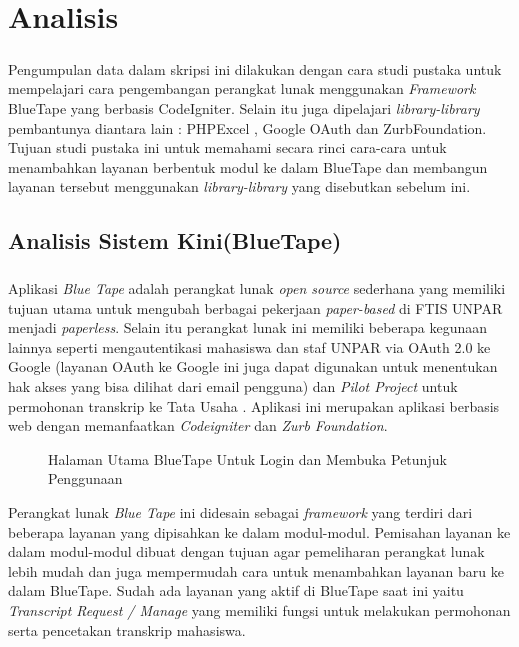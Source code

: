 \chapter{Analisis}
\label{chap:analisis}
\setcounter{secnumdepth}{3}

\paragraph{} Pengumpulan data dalam skripsi ini dilakukan dengan cara studi pustaka untuk mempelajari cara pengembangan perangkat lunak menggunakan \textit{Framework} BlueTape yang berbasis CodeIgniter. Selain itu juga dipelajari \textit{library-library} pembantunya diantara lain : PHPExcel , Google OAuth dan ZurbFoundation. Tujuan studi pustaka ini untuk memahami secara rinci cara-cara untuk menambahkan layanan berbentuk modul ke dalam BlueTape dan membangun layanan tersebut menggunakan \textit{library-library} yang disebutkan sebelum ini.

\section{Analisis Sistem Kini(BlueTape)}
\paragraph{} Aplikasi \textit{Blue Tape} adalah perangkat lunak \textit{open source} sederhana yang memiliki tujuan utama untuk mengubah berbagai pekerjaan \textit{paper-based} di FTIS UNPAR menjadi \textit{paperless}. Selain itu perangkat lunak ini memiliki beberapa kegunaan lainnya seperti mengautentikasi mahasiswa dan staf UNPAR via OAuth 2.0 ke Google (layanan OAuth ke Google ini juga dapat digunakan untuk menentukan hak akses yang bisa dilihat dari email pengguna) dan \textit{Pilot Project} untuk permohonan transkrip ke Tata Usaha . Aplikasi ini merupakan aplikasi berbasis web dengan memanfaatkan \textit{Codeigniter} dan \textit{Zurb Foundation}. 
\newline
\begin{figure} [H]
	\centering  
	\caption[Halaman Utama BlueTape Untuk Login dan Membuka Petunjuk Penggunaan]{Halaman Utama BlueTape Untuk Login dan Membuka Petunjuk Penggunaan} 
	\label{fig:flow-chart-CodeIgniter} 
\end{figure}
Perangkat lunak \textit{Blue Tape} ini didesain sebagai \textit{framework} yang terdiri dari beberapa layanan yang dipisahkan ke dalam modul-modul. Pemisahan layanan ke dalam modul-modul dibuat dengan tujuan agar pemeliharan perangkat lunak lebih mudah dan juga mempermudah cara untuk menambahkan layanan baru ke dalam BlueTape. Sudah ada layanan yang aktif di BlueTape saat ini yaitu \textit{Transcript Request / Manage} yang memiliki fungsi untuk melakukan permohonan serta pencetakan transkrip mahasiswa.

